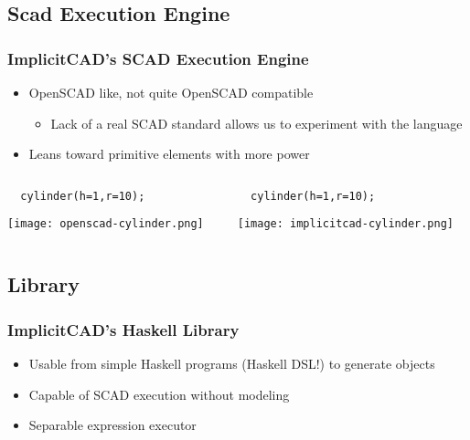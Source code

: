 \documentclass{beamer}
\begin{document}
\subsection{Scad Execution Engine}
\begin{frame}[fragile]
\frametitle{ImplicitCAD's SCAD Execution Engine}
\begin{itemize}
\item OpenSCAD like, not quite OpenSCAD compatible
\begin{itemize}
\item Lack of a real SCAD standard allows us to experiment with the language
\end{itemize}
\item Leans toward primitive elements with more power
\end{itemize}
\begin{columns}
  \begin{column}{0.5\textwidth}
  \lstset{basicstyle=\ttfamily\scriptsize}
\begin{lstlisting}
  cylinder(h=1,r=10);
\end{lstlisting}
    \texttt{[image: openscad-cylinder.png]}
  \end{column}
  \begin{column}{0.5\textwidth}
  \lstset{basicstyle=\ttfamily\scriptsize}
\begin{lstlisting}
  cylinder(h=1,r=10);
\end{lstlisting}
    \texttt{[image: implicitcad-cylinder.png]}
  \end{column}
\end{columns}
\end{frame}

\subsection{Library}
\begin{frame}
\frametitle{ImplicitCAD's Haskell Library}
\begin{itemize}
\item Usable from simple Haskell programs (Haskell DSL!) to generate objects
\item Capable of SCAD execution without modeling
\item Separable expression executor
\end{itemize}
\end{frame}
\end{document}
